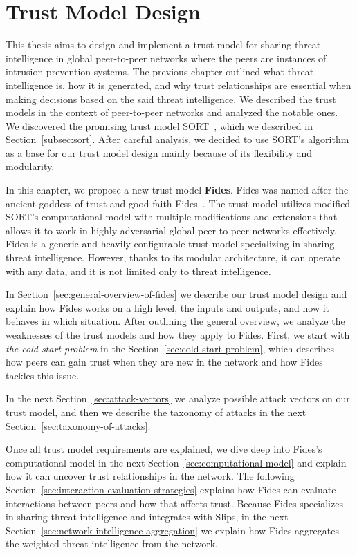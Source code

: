 \chapter{Trust Model Design}
\label{ch:trust-model-design}
This thesis aims to design and implement a trust model for sharing threat intelligence in global peer-to-peer networks where the peers are instances of intrusion prevention systems.
The previous chapter outlined what threat intelligence is, how it is generated, and why trust relationships are essential when making decisions based on the said threat intelligence.
We described the trust models in the context of peer-to-peer networks and analyzed the notable ones.
We discovered the promising trust model SORT~\cite{sort}, which we described in Section~\ref{subsec:sort}. After careful analysis, we decided to use SORT's algorithm as a base for our trust model design mainly because of its flexibility and modularity.

In this chapter, we propose a new trust model \textbf{Fides}.
Fides was named after the ancient goddess of trust and good faith Fides~\cite{enwiki:1086924565}.
The trust model utilizes modified SORT's computational model with multiple modifications and extensions that allows it to work in highly adversarial global peer-to-peer networks effectively.
Fides is a generic and heavily configurable trust model specializing in sharing threat intelligence.
However, thanks to its modular architecture, it can operate with any data, and it is not limited only to threat intelligence.

In Section~\ref{sec:general-overview-of-fides} we describe our trust model design and explain how Fides works on a high level, the inputs and outputs, and how it behaves in which situation. After outlining the general overview, we analyze the weaknesses of the trust models and how they apply to Fides.
First, we start with \textit{the cold start problem} in the Section~\ref{sec:cold-start-problem}, which describes how peers can gain trust when they are new in the network and how Fides tackles this issue.

In the next Section~\ref{sec:attack-vectors} we analyze possible attack vectors on our trust model, and then we describe the taxonomy of attacks in the next Section~\ref{sec:taxonomy-of-attacks}.

Once all trust model requirements are explained, we dive deep into Fides's computational model in the next Section~\ref{sec:computational-model}  and explain how it can uncover trust relationships in the network.
The following Section~\ref{sec:interaction-evaluation-strategies} explains how Fides can evaluate interactions between peers and how that affects trust.
Because Fides specializes in sharing threat intelligence and integrates with Slips, in the next Section~\ref{sec:network-intelligence-aggregation} we explain how Fides aggregates the weighted threat intelligence from the network.

